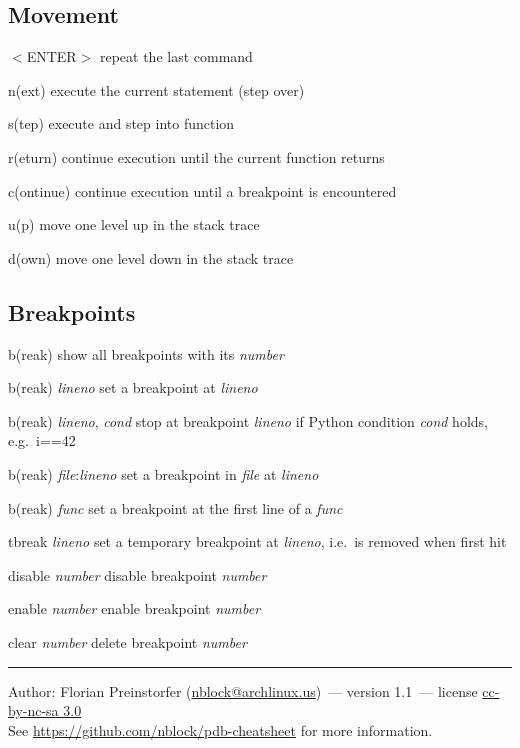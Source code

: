 \documentclass[10pt,landscape,a4paper]{article}
\makeatletter
\newcommand{\theauthor}{Florian Preinstorfer (\href{mailto:nblock@archlinux.us}{nblock@archlinux.us})}
\newcommand{\theversion}{1.1}
\newcommand{\keystroke}[1]{$<$#1$>$}
\makeatother
\begin{document}
\begin{multicols}{2}
    \subsection{Movement}
      \begin{eqlist}
        \item[\keystroke{ENTER}] repeat the last command
        \item[n(ext)] execute the current statement (step over)
        \item[s(tep)] execute and step into function
        \item[r(eturn)] continue execution until the current function returns
        \item[c(ontinue)] continue execution until a breakpoint is encountered
        \item[u(p)] move one level up in the stack trace
        \item[d(own)] move one level down in the stack trace
      \end{eqlist}

    \subsection{Breakpoints}
      \begin{eqlist}
        \item[b(reak)] show all breakpoints with its \textit{number}
        \item[b(reak) \textit{lineno}] set a breakpoint at \textit{lineno}
        \item[b(reak) \textit{lineno}, \textit{cond}] stop at breakpoint \textit{lineno} if Python condition \textit{cond} holds, e.g.\ i==42
        \item[b(reak) \textit{file}:\textit{lineno}] set a breakpoint in \textit{file} at \textit{lineno}
        \item[b(reak) \textit{func}] set a breakpoint at the first line of a \textit{func}
        \item[tbreak \textit{lineno}] set a temporary breakpoint at \textit{lineno}, i.e.\ is removed when first hit
        \item[disable \textit{number}] disable breakpoint \textit{number}
        \item[enable \textit{number}] enable breakpoint \textit{number}
        \item[clear \textit{number}] delete breakpoint \textit{number}
      \end{eqlist}

    \small{
    \hrule
    Author: \theauthor~--- version \theversion~--- license \href{https://creativecommons.org/licenses/by-nc-sa/3.0}{cc-by-nc-sa 3.0}\\
    See \url{https://github.com/nblock/pdb-cheatsheet} for more information.
    }
  \end{multicols}
\end{document}

